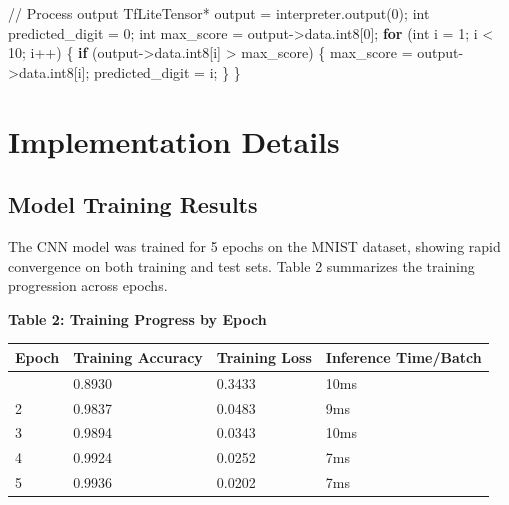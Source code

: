\documentclass[
  9pt,
  letterpaper,
  abstract,
  titlepage]{scrbook}
\newenvironment{Shaded}{\begin{snugshade}}{\end{snugshade}}
\newcommand{\CommentTok}[1]{\textcolor[rgb]{0.37,0.37,0.37}{#1}}
\newcommand{\ControlFlowTok}[1]{\textcolor[rgb]{0.00,0.23,0.31}{\textbf{#1}}}
\newcommand{\DataTypeTok}[1]{\textcolor[rgb]{0.68,0.00,0.00}{#1}}
\newcommand{\DecValTok}[1]{\textcolor[rgb]{0.68,0.00,0.00}{#1}}
\newcommand{\NormalTok}[1]{\textcolor[rgb]{0.00,0.23,0.31}{#1}}
\newcommand{\OperatorTok}[1]{\textcolor[rgb]{0.37,0.37,0.37}{#1}}
\begin{document}
\begin{Shaded}
\begin{Highlighting}[]
\CommentTok{// Process output}
\NormalTok{TfLiteTensor}\OperatorTok{*}\NormalTok{ output }\OperatorTok{=}\NormalTok{ interpreter}\OperatorTok{.}\NormalTok{output}\OperatorTok{(}\DecValTok{0}\OperatorTok{);}
\DataTypeTok{int}\NormalTok{ predicted\_digit }\OperatorTok{=} \DecValTok{0}\OperatorTok{;}
\DataTypeTok{int}\NormalTok{ max\_score }\OperatorTok{=}\NormalTok{ output}\OperatorTok{{-}\textgreater{}}\NormalTok{data}\OperatorTok{.}\NormalTok{int8}\OperatorTok{[}\DecValTok{0}\OperatorTok{];}
\ControlFlowTok{for} \OperatorTok{(}\DataTypeTok{int}\NormalTok{ i }\OperatorTok{=} \DecValTok{1}\OperatorTok{;}\NormalTok{ i }\OperatorTok{\textless{}} \DecValTok{10}\OperatorTok{;}\NormalTok{ i}\OperatorTok{++)} \OperatorTok{\{}
    \ControlFlowTok{if} \OperatorTok{(}\NormalTok{output}\OperatorTok{{-}\textgreater{}}\NormalTok{data}\OperatorTok{.}\NormalTok{int8}\OperatorTok{[}\NormalTok{i}\OperatorTok{]} \OperatorTok{\textgreater{}}\NormalTok{ max\_score}\OperatorTok{)} \OperatorTok{\{}
\NormalTok{        max\_score }\OperatorTok{=}\NormalTok{ output}\OperatorTok{{-}\textgreater{}}\NormalTok{data}\OperatorTok{.}\NormalTok{int8}\OperatorTok{[}\NormalTok{i}\OperatorTok{];}
\NormalTok{        predicted\_digit }\OperatorTok{=}\NormalTok{ i}\OperatorTok{;}
    \OperatorTok{\}}
\OperatorTok{\}}
\end{Highlighting}
\end{Shaded}

\section{Implementation Details}\label{implementation-details}

\subsection{Model Training Results}\label{model-training-results}

The CNN model was trained for 5 epochs on the MNIST dataset, showing
rapid convergence on both training and test sets. Table 2 summarizes the
training progression across epochs.

\textbf{Table 2: Training Progress by Epoch}

\begin{longtable}[]{@{}llll@{}}
\toprule\noalign{}
Epoch & Training Accuracy & Training Loss & Inference Time/Batch \\
\midrule\noalign{}
\endhead
\bottomrule\noalign{}
\endlastfoot
1 & 0.8930 & 0.3433 & 10ms \\
2 & 0.9837 & 0.0483 & 9ms \\
3 & 0.9894 & 0.0343 & 10ms \\
4 & 0.9924 & 0.0252 & 7ms \\
5 & 0.9936 & 0.0202 & 7ms \\
\end{longtable}
\end{document}
